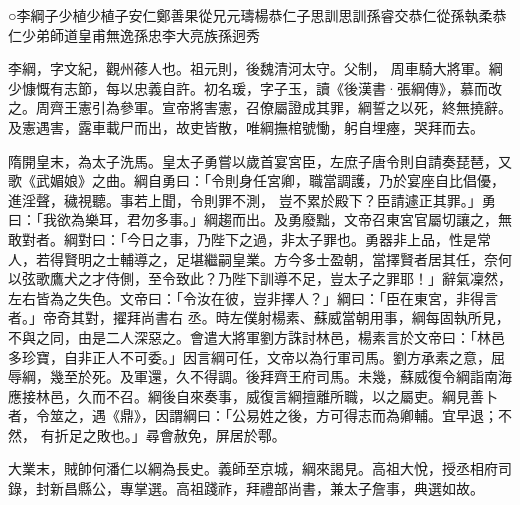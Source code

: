 
\begin{pinyinscope}

 ○李綱子少植少植子安仁鄭善果從兄元璹楊恭仁子思訓思訓孫睿交恭仁從孫執柔恭仁少弟師道皇甫無逸孫忠李大亮族孫迥秀



 李綱，字文紀，觀州蓚人也。祖元則，後魏清河太守。父制，
 周車騎大將軍。綱少慷慨有志節，每以忠義自許。初名瑗，字子玉，讀《後漢書·張綱傳》，慕而改之。周齊王憲引為參軍。宣帝將害憲，召僚屬證成其罪，綱誓之以死，終無撓辭。及憲遇害，露車載尸而出，故吏皆散，唯綱撫棺號慟，躬自埋瘞，哭拜而去。



 隋開皇末，為太子洗馬。皇太子勇嘗以歲首宴宮臣，左庶子唐令則自請奏琵琶，又歌《武媚娘》之曲。綱自勇曰：「令則身任宮卿，職當調護，乃於宴座自比倡優，進淫聲，穢視聽。事若上聞，令則罪不測，
 豈不累於殿下？臣請遽正其罪。」勇曰：「我欲為樂耳，君勿多事。」綱趨而出。及勇廢黜，文帝召東宮官屬切讓之，無敢對者。綱對曰：「今日之事，乃陛下之過，非太子罪也。勇器非上品，性是常人，若得賢明之士輔導之，足堪繼嗣皇業。方今多士盈朝，當擇賢者居其任，奈何以弦歌鷹犬之才侍側，至令致此？乃陛下訓導不足，豈太子之罪耶！」辭氣凜然，左右皆為之失色。文帝曰：「令汝在彼，豈非擇人？」綱曰：「臣在東宮，非得言者。」帝奇其對，擢拜尚書右
 丞。時左僕射楊素、蘇威當朝用事，綱每固執所見，不與之同，由是二人深惡之。會遣大將軍劉方誅討林邑，楊素言於文帝曰：「林邑多珍寶，自非正人不可委。」因言綱可任，文帝以為行軍司馬。劉方承素之意，屈辱綱，幾至於死。及軍還，久不得調。後拜齊王府司馬。未幾，蘇威復令綱詣南海應接林邑，久而不召。綱後自來奏事，威復言綱擅離所職，以之屬吏。綱見善卜者，令筮之，遇《鼎》，因謂綱曰：「公易姓之後，方可得志而為卿輔。宜早退；不然，
 有折足之敗也。」尋會赦免，屏居於鄠。



 大業末，賊帥何潘仁以綱為長史。義師至京城，綱來謁見。高祖大悅，授丞相府司錄，封新昌縣公，專掌選。高祖踐祚，拜禮部尚書，兼太子詹事，典選如故。




\end{pinyinscope}
